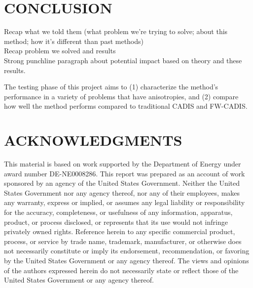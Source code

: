 \documentclass[12pt]{article}
\begin{document}

%
\section{CONCLUSION} 
\label{sect::conclusion}

Recap what we told them (what problem we're trying to solve; about this method; how it's different than past methods)\\
Recap problem we solved and results\\
Strong punchline paragraph about potential impact based on theory and these results.

The testing phase of this project aims to (1) characterize the method's performance in a variety of problems that have anisotropies, and (2) compare how well the method performs compared to traditional CADIS and FW-CADIS.

%
\section*{ACKNOWLEDGMENTS}

This material is based on work supported by the Department of Energy under award number DE-NE0008286. This report was prepared as an account of work sponsored by an agency of the United States Government. Neither the United States Government nor any agency thereof, nor any of their employees, makes any warranty, express or implied, or assumes any legal liability or responsibility for the accuracy, completeness, or usefulness of any information, apparatus, product, or process disclosed, or represents that its use would not infringe privately owned rights. Reference herein to any specific commercial product, process, or service by trade name, trademark, manufacturer, or otherwise does not necessarily constitute or imply its endorsement, recommendation, or favoring by the United States Government or any agency thereof. The views and opinions of the authors expressed herein do not necessarily state or reflect those of the United States Government or any agency thereof.
\end{document}
